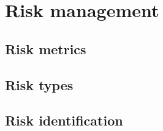 \section{Risk management}

\subsection{Risk metrics}

\subsection{Risk types}

\subsection{Risk identification}

